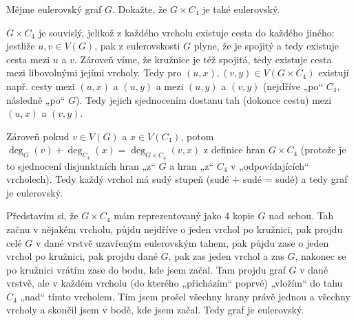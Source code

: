 \documentclass[12pt]{article}					%
\begin{document}
\begin{priklad}[2]
    Mějme eulerovský graf $G$. Dokažte, že $G\times C_4$ je také eulerovský. 


    \begin{reseni}[Nekonstruktivní]
        $G\times C_4$ je souvislý, jelikož z každého vrcholu existuje cesta do každého jiného: jestliže $u, v \in V(G)$, pak z eulerovskosti $G$ plyne, že je spojitý a tedy existuje cesta mezi $u$ a $v$. Zároveň víme, že kružnice je též spojitá, tedy existuje cesta mezi libovolnými jejími vrcholy. Tedy pro $(u, x), (v, y) \in V(G\times C_4)$ existují např. cesty mezi $(u, x)$ a $(u, y)$ a mezi $(u, y)$ a $(v, y)$ (nejdříve „po“ $C_4$, následně „po“ $G$). Tedy jejich sjednocením dostanu tah (dokonce cestu) mezi $(u, x)$ a $(v, y)$.

        Zároveň pokud $v \in V(G)$ a $x \in V(C_4)$, potom $\deg_G(v) + \deg_{C_4}(x) = \deg_{G\times C_4}(v, x)$ z definice hran $G\times C_4$ (protože je to sjednocení disjunktních hran „z“ $G$ a hran „z“ $C_4$ v „odpovídajících“ vrcholech). Tedy každý vrchol má sudý stupeň (sudé + sudé = sudé) a tedy graf je eulerovský.
    \end{reseni}

    \begin{reseni}[Konstruktivní]
        Představím si, že $G\times C_4$ mám reprezentovaný jako 4 kopie $G$ nad sebou. Tah začnu v nějakém vrcholu, půjdu nejdříve o jeden vrchol po kružnici, pak projdu celé $G$ v dané vrstvě uzavřeným eulerovským tahem, pak půjdu zase o jeden vrchol po kružnici, pak projdu dané $G$, pak zas jeden vrchol a zas $G$, nakonec se po kružnici vrátím zase do bodu, kde jsem začal. Tam projdu graf $G$ v dané vrstvě, ale v každém vrcholu (do kterého „přicházím“ poprvé) „vložím“ do tahu $C_4$ „nad“ tímto vrcholem. Tím jsem prošel všechny hrany právě jednou a všechny vrcholy a skončil jsem v bodě, kde jsem začal. Tedy graf je eulerovský.
    \end{reseni}
\end{priklad}
\end{document}
